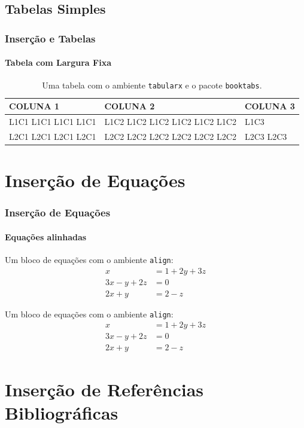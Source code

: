 \documentclass[10pt,aspectratio=169]{beamer}
\begin{document}
\subsection{Tabelas Simples}

\begin{frame}
\frametitle{Inserção e Tabelas}
\framesubtitle{Tabela com Largura Fixa}
\begin{table}
\caption{Uma tabela com o ambiente {\tt tabularx} e o pacote {\tt booktabs}.}	
\begin{tabularx}{\textwidth}{X X X}
\toprule
\textbf{COLUNA 1} & \textbf{COLUNA 2} & \textbf{COLUNA 3} \\
\midrule
L1C1 L1C1 L1C1 L1C1 & L1C2 L1C2 L1C2 L1C2 L1C2 L1C2 & L1C3      \\
L2C1 L2C1 L2C1 L2C1 & L2C2 L2C2 L2C2 L2C2 L2C2 L2C2 & L2C3 L2C3 \\
\bottomrule
\end{tabularx}
\end{table}
\end{frame}

\section{Inserção de Equações}

\begin{frame}
\frametitle{Inserção de Equações}
\framesubtitle{Equações alinhadas}
\begin{block}{Um bloco de equações com o ambiente {\tt align}:}
\begin{align*}
x & = 1 + 2y + 3z \\
3x - y + 2z & = 0 \\
2x + y & = 2 - z
\end{align*}
\end{block}
\pause
\vspace{-1em}
\begin{problock1}{Um bloco de equações com o ambiente {\tt align}:}
\begin{align}
x & = 1 + 2y + 3z \\
3x - y + 2z & = 0 \\
2x + y & = 2 - z
\end{align}
\end{problock1}
\end{frame}

\section{Inserção de Referências Bibliográficas}
\end{document}
